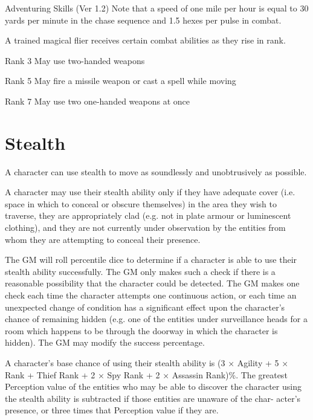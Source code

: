 \begin{Chapter}{Adventuring Skills (Ver 1.2)}
Note that a speed of one mile per hour is equal to 30 yards per minute
in the chase sequence and 1.5 hexes per pulse in combat.

A trained magical flier receives certain combat abilities as they rise
in rank.

\begin{Description}

\item[Rank 3]  May use two-handed weapons 

\item [Rank 5] May fire a missile weapon or cast a spell while moving

\item[Rank 7] May use two one-handed weapons at once

\end{Description}

\section{Stealth}

A character can use stealth to move as soundlessly and unobtrusively
as possible.

A character may use their stealth ability only if they have adequate
cover (i.e. space in which to conceal or obscure themselves) in the
area they wish to traverse, they are appropriately clad (e.g.  not in
plate armour or luminescent clothing), and they are not currently
under observation by the entities from whom they are attempting to
conceal their presence.

The GM will roll percentile dice to determine if a character is able
to use their stealth ability successfully.  The GM only makes such a
check if there is a reasonable possibility that the character could be
detected.  The GM makes one check each time the character attempts one
continuous action, or each time an unexpected change of condition has
a significant effect upon the character’s chance of remaining hidden
(e.g.  one of the entities under surveillance heads for a room which
happens to be through the doorway in which the character is
hidden). The GM may modify the success percentage.

A character’s base chance of using their stealth ability is (3 ×
Agility + 5 × Rank + Thief Rank + 2 × Spy Rank + 2 × Assassin Rank)\%.
The greatest Perception value of the entities who may be able to
discover the character using the stealth ability is subtracted if
those entities are unaware of the char- acter’s presence, or three
times that Perception value if they are.


\end{Chapter}
